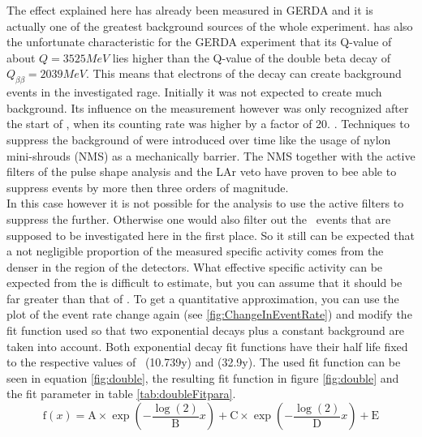 \documentclass[encoding=utf8,british]{tumphthesis}
\begin{document}
The effect explained here has already been measured in GERDA and it is actually one of the greatest background sources of the whole experiment.
 has also the unfortunate characteristic for the GERDA experiment that its Q-value of about $Q =3525\unit{MeV}$ lies higher than the Q-value of the double beta decay of  $Q_{\beta \beta} = 2039\unit{MeV}$.
This means that electrons of the  decay can create background events in the investigated rage. 
Initially it was not expected to create much background.
Its influence on the measurement however was only recognized after the start of \PI, when its counting rate was higher by a factor of 20. \cite{becerici_schmidt_results_2014}. %
Techniques to suppress the background of  were introduced over time like the usage of nylon mini-shrouds (NMS) as a mechanically barrier.
The NMS together with the active filters of the pulse shape analysis and the LAr veto have proven to bee able to suppress  events by more then three orders of magnitude.
\\

In this case however it is not possible for the analysis to use the active filters to suppress the  further.
Otherwise one would also filter out the \Kr\ events that are supposed to be investigated here in the first place.
So it still can be expected that a not negligible proportion of the measured specific activity comes from the denser  in the region of the detectors.
What effective specific activity can be expected from the  is difficult to estimate, but you can assume that it should be far greater than that of \Kr.
To get a quantitative approximation, you can use the plot of the event rate change again (see \ref{fig:ChangeInEventRate}) and modify the fit function used so that two exponential decays plus a constant background are taken into account.
Both exponential decay fit functions have their half life fixed to the respective values of \Kr\ (10.739y) and  (32.9y).
The used fit function can be seen in equation \ref{fig:double}, the resulting fit function in figure \ref{fig:double} and the fit parameter in table \ref{tab:doubleFitpara}.
\begin{equation}
    \mathrm{f}(x) = \mathrm{A}\times\exp\left(-\frac{\log(2)}{\mathrm{B}} x \right) + \mathrm{C}\times\exp\left(-\frac{\log(2)}{\mathrm{D}} x \right) + \mathrm{E}
\end{equation}
\end{document}
